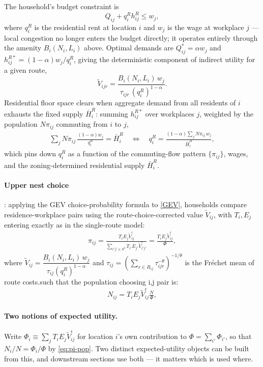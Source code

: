 \documentclass[12pt, a4paper]{article}
\theoremstyle{definition}
\theoremstyle{remark}
\begin{document}
The household's budget constraint is
\[
Q_{ij} + q_i^R h_{ij}^R \leq w_j,
\]
where $q_i^R$ is the residential rent at location $i$ and $w_j$ is the wage at workplace $j$ — local congestion no longer enters the budget directly; it operates entirely through the amenity $B_i(N_i,L_i)$ above. Optimal demands are $Q_{ij}^* = \alpha w_j$ and $h_{ij}^{R*} = (1-\alpha)w_j/q_i^R$, giving the deterministic component of indirect utility for a given route,
\[
\tilde{V}_{ijr} = \frac{B_i(N_i,L_i)\, w_j}{\tau_{ijr}\,(q_i^R)^{1-\alpha}}.
\]
Residential floor space clears when aggregate demand from all residents of $i$ exhausts the fixed supply $\bar H_i^R$: summing $h_{ij}^{R*}$ over workplaces $j$, weighted by the population $N\pi_{ij}$ commuting from $i$ to $j$,
\begin{align}
    \label{eq:rent-clearing}
    \sum_j N\pi_{ij}\,\frac{(1-\alpha)w_j}{q_i^R} = \bar H_i^R
    \quad\Longleftrightarrow\quad
    q_i^R = \frac{(1-\alpha)\sum_j N\pi_{ij}\,w_j}{\bar H_i^R},
\end{align}
which pins down $q_i^R$ as a function of the commuting-flow pattern $\{\pi_{ij}\}$, wages, and the zoning-determined residential supply $\bar H_i^R$.

\paragraph{Upper nest choice}: applying the GEV choice-probability formula to \eqref{GEV}, households compare residence-workplace pairs using the route-choice-corrected value $\tilde V_{ij}$, with $T_i,E_j$ entering exactly as in the single-route model:
\begin{align}
    \label{eq:pi}
    \pi_{ij} = \frac{T_i E_j \tilde{V}_{ij}^{\epsilon}}{\sum_{i'j' \in S^{2}} T_{i'} E_{j'} \tilde{V}_{i'j'}^{\epsilon}} = \frac{T_iE_j\tilde V_{ij}^\epsilon}{\Phi},
\end{align}
where $\tilde{V}_{ij}=\dfrac{B_i(N_i,L_i)\,w_j}{\tau_{ij}(q_{i}^R)^{1-\alpha}}$ and $\tau_{ij} = \left(\sum_{r\in R_{ij}}\tau_{ijr}^{-\theta}\right)^{-1/\theta}$ is the Fréchet mean of route costs.such that the population choosing i,j pair is:
\begin{align}
    \label{eq:pi-pop}
    N_{ij} =T_iE_j\tilde V_{ij}^\epsilon \frac{N}{\Phi},
\end{align}

\paragraph{Two notions of expected utility.} Write $\Phi_i\equiv\sum_j T_iE_j\tilde V_{ij}^\epsilon$ for location $i$'s own contribution to $\Phi=\sum_{i'}\Phi_{i'}$, so that $N_i/N=\Phi_i/\Phi$ by \eqref{eq:pi-pop}. Two distinct expected-utility objects can be built from this, and downstream sections use both — it matters which is used where.
\end{document}
